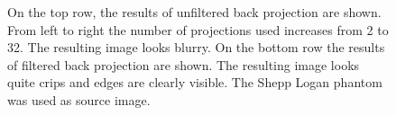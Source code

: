 \documentclass[10pt,journal,compsoc]{IEEEtran}
\begin{document}
\begin{figure}[!h]
\hfil
{}
\hfil
{}
\caption{
On the top row, the results of unfiltered back projection are shown. 
From left to right the number of projections used increases from 2 to 32.
The resulting image looks blurry.
On the bottom row the results of filtered back projection are shown.
The resulting image looks quite crips and edges are clearly visible.
The Shepp Logan phantom~\cite{shepplogan} was used as source image.  
}
\label{fig:backprojection}
\end{figure}
%
\end{document}
